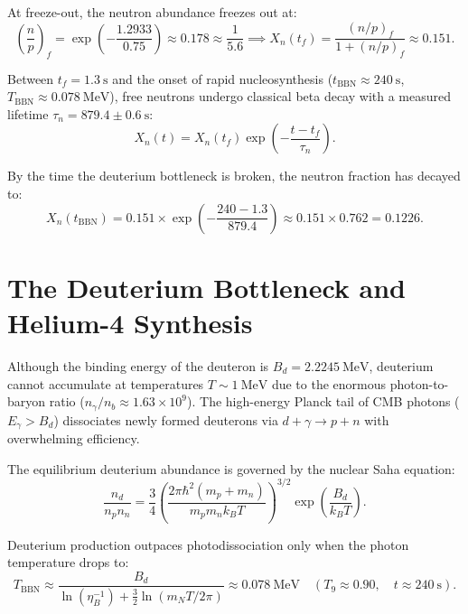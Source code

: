 \documentclass[11pt, a4paper]{article}
\theoremstyle{definition}
\theoremstyle{remark}
\begin{document}
At freeze-out, the neutron abundance freezes out at:
\begin{equation}
  \left(\frac{n}{p}\right)_f = \exp\left(-\frac{1.2933}{0.75}\right) \approx 0.178 \approx \frac{1}{5.6} \implies X_n(t_f) = \frac{(n/p)_f}{1 + (n/p)_f} \approx 0.151.
\end{equation}

Between $t_f = 1.3~\mathrm{s}$ and the onset of rapid nucleosynthesis ($t_{\mathrm{BBN}} \approx 240~\mathrm{s}$, $T_{\mathrm{BBN}} \approx 0.078~\mathrm{MeV}$), free neutrons undergo classical beta decay with a measured lifetime $\tau_n = 879.4 \pm 0.6~\mathrm{s}$:
\begin{equation}
  X_n(t) = X_n(t_f) \exp\left(-\frac{t - t_f}{\tau_n}\right).
\end{equation}

By the time the deuterium bottleneck is broken, the neutron fraction has decayed to:
\begin{equation}
  X_n(t_{\mathrm{BBN}}) = 0.151 \times \exp\left(-\frac{240 - 1.3}{879.4}\right) \approx 0.151 \times 0.762 = 0.1226.
\end{equation}

\section{The Deuterium Bottleneck and Helium-4 Synthesis}

Although the binding energy of the deuteron is $B_d = 2.2245~\mathrm{MeV}$, deuterium cannot accumulate at temperatures $T \sim 1~\mathrm{MeV}$ due to the enormous photon-to-baryon ratio ($n_\gamma / n_b \approx 1.63 \times 10^9$). The high-energy Planck tail of CMB photons ($E_\gamma > B_d$) dissociates newly formed deuterons via $d + \gamma \to p + n$ with overwhelming efficiency.

The equilibrium deuterium abundance is governed by the nuclear Saha equation:
\begin{equation}
  \frac{n_d}{n_p n_n} = \frac{3}{4} \left(\frac{2\pi \hbar^2 (m_p + m_n)}{m_p m_n k_B T}\right)^{3/2} \exp\left(\frac{B_d}{k_B T}\right).
\end{equation}

Deuterium production outpaces photodissociation only when the photon temperature drops to:
\begin{equation}
  T_{\mathrm{BBN}} \approx \frac{B_d}{\ln(\eta_B^{-1}) + \frac{3}{2}\ln(m_N T / 2\pi)} \approx 0.078~\mathrm{MeV} \quad (T_9 \approx 0.90, \quad t \approx 240~\mathrm{s}).
\end{equation}
\end{document}
